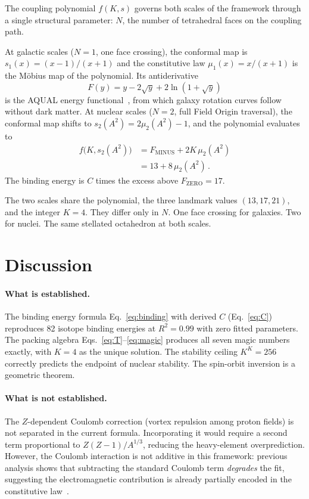 \documentclass[twocolumn]{iopjournal}
\newcommand{\FZERO}{F_{\mathrm{ZERO}}}
\newcommand{\FMINUS}{F_{\mathrm{MINUS}}}
\begin{document}
The coupling polynomial $f(K, s)$ governs both scales of the
framework through a single structural parameter: $N$, the number
of tetrahedral faces on the coupling path.

At galactic scales ($N = 1$, one face crossing), the conformal map
is $s_1(x) = (x{-}1)/(x{+}1)$ and the constitutive law
$\mu_1(x) = x/(x{+}1)$ is the M\"obius map of the polynomial.
Its antiderivative
\begin{equation}
  F(y) = y - 2\sqrt{y} + 2\ln(1 + \sqrt{y})
\end{equation}
is the AQUAL energy functional~\cite{bekenstein1984}, from which
galaxy rotation curves follow without dark matter.
At nuclear scales ($N = 2$, full Field Origin traversal), the
conformal map shifts to $s_2(A^2) = 2\mu_2(A^2) - 1$, and the
polynomial evaluates to
\begin{align}
  f\bigl(K, s_2(A^2)\bigr) &= \FMINUS + 2K\,\mu_2(A^2) \nonumber\\
  &= 13 + 8\,\mu_2(A^2)\,.
\end{align}
The binding energy is $C$ times the excess above $\FZERO = 17$.

The two scales share the polynomial, the three landmark values
$(13, 17, 21)$, and the integer $K = 4$.
They differ only in $N$.
One face crossing for galaxies. Two for nuclei.
The same stellated octahedron at both scales.


\section{Discussion}

\paragraph{What is established.}
The binding energy formula Eq.~\eqref{eq:binding} with
derived $C$ (Eq.~\ref{eq:C}) reproduces 82 isotope binding
energies at $R^2 = 0.99$ with zero fitted parameters.
The packing algebra Eqs.~\eqref{eq:T}--\eqref{eq:magic} produces
all seven magic numbers exactly, with $K = 4$ as the unique
solution. The stability ceiling $K^K = 256$ correctly predicts
the endpoint of nuclear stability.
The spin-orbit inversion is a geometric theorem.

\paragraph{What is not established.}
The $Z$-dependent Coulomb correction (vortex repulsion among
proton fields) is not separated in the current formula.
Incorporating it would require a second term proportional to
$Z(Z{-}1)/A^{1/3}$, reducing the heavy-element overprediction.
However, the Coulomb interaction is not additive in this
framework: previous analysis shows that subtracting the
standard Coulomb term \emph{degrades} the fit, suggesting
the electromagnetic contribution is already partially encoded
in the constitutive law~\cite{nelson2025b}.
\end{document}
